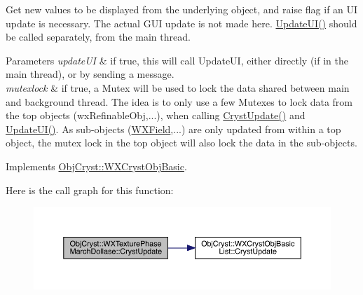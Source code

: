 Get new values to be displayed from the underlying object, and raise flag if an UI update is necessary. The actual G\+UI update is not made here. \mbox{\hyperlink{class_obj_cryst_1_1_w_x_texture_phase_march_dollase_ab9dffa65029bbd9d9c07e07e5b2ccf99}{Update\+U\+I()}} should be called separately, from the main thread.


\begin{DoxyParams}{Parameters}
{\em update\+UI} & if true, this will call Update\+UI, either directly (if in the main thread), or by sending a message. \\
\hline
{\em mutexlock} & if true, a Mutex will be used to lock the data shared between main and background thread. The idea is to only use a few Mutexes to lock data from the top objects (wx\+Refinable\+Obj,...), when calling \mbox{\hyperlink{class_obj_cryst_1_1_w_x_texture_phase_march_dollase_a9f7baf1967a22db565f84f354d0eaa88}{Cryst\+Update()}} and \mbox{\hyperlink{class_obj_cryst_1_1_w_x_texture_phase_march_dollase_ab9dffa65029bbd9d9c07e07e5b2ccf99}{Update\+U\+I()}}. As sub-\/objects (\mbox{\hyperlink{class_obj_cryst_1_1_w_x_field}{W\+X\+Field}},...) are only updated from within a top object, the mutex lock in the top object will also lock the data in the sub-\/objects. \\
\hline
\end{DoxyParams}


Implements \mbox{\hyperlink{class_obj_cryst_1_1_w_x_cryst_obj_basic_a7ac00ae2ae28f1a6fa26e6fa571186b6}{Obj\+Cryst\+::\+W\+X\+Cryst\+Obj\+Basic}}.

Here is the call graph for this function\+:
\nopagebreak
\begin{figure}[H]
\begin{center}
\leavevmode
\includegraphics[width=350pt]{class_obj_cryst_1_1_w_x_texture_phase_march_dollase_a9f7baf1967a22db565f84f354d0eaa88_cgraph}
\end{center}
\end{figure}
\mbox{\label{class_obj_cryst_1_1_w_x_texture_phase_march_dollase_ab9dffa65029bbd9d9c07e07e5b2ccf99}} 
